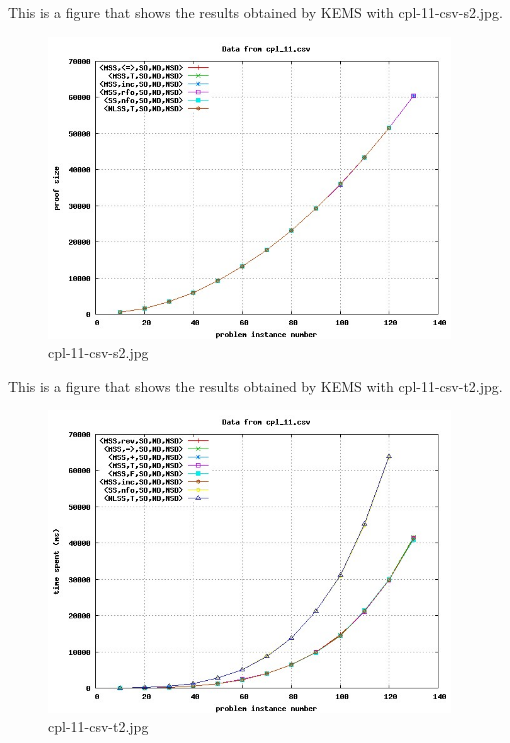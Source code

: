 This is a figure that shows the results obtained by KEMS with cpl-11-csv-s2.jpg.
\begin{figure}[htbp]
\begin{center}
\includegraphics[width=0.95\textwidth]{figuras/cpl-11-csv-s2.jpg}
\end{center}
\caption{cpl-11-csv-s2.jpg}
\end{figure}

This is a figure that shows the results obtained by KEMS with cpl-11-csv-t2.jpg.
\begin{figure}[htbp]
\begin{center}
\includegraphics[width=0.95\textwidth]{figuras/cpl-11-csv-t2.jpg}
\end{center}
\caption{cpl-11-csv-t2.jpg}
\end{figure}

